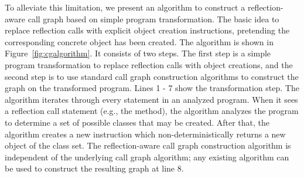 

To alleviate this limitation, we present an algorithm to construct
a reflection-aware call graph based on simple program transformation.
The basic idea to replace reflection calls with explicit object
creation instructions, pretending the corresponding concrete object
has been created.  The algorithm is shown in Figure~\ref{fig:cgalgorithm}.
It consists of two steps. The first step is a simple program
transformation to replace reflection calls with object creations, and
the second step is to use standard call graph construction algorithms
to construct the graph on the transformed program. Lines 1 - 7 show
the transformation step. The algorithm iterates through every statement
in an analyzed program. When it sees a reflection call statement (e.g.,
the  method), the algorithm analyzes the
program to determine a set of possible classes that may be created.
After that, the algorithm creates a new instruction which non-deterministically
returns a new object of the class set. The reflection-aware call graph
construction algorithm is independent of the underlying call graph algorithm;
any existing algorithm can be used to construct the resulting graph at line 8.

